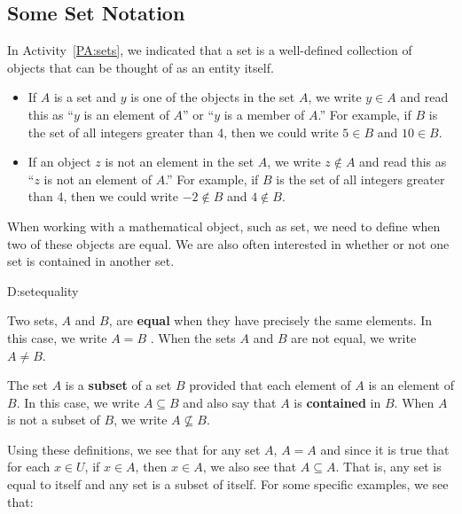 \subsection*{Some Set Notation}\label{SS:sets}
In \typeu Activity~\ref*{PA:sets}, we indicated that a set is a well-defined collection of objects that can be thought of as an entity itself.  
\begin{itemize}
  \item If  $A$  is a set and  $y$  is one of the objects in the set $A$, we write  $y \in A$ 
\label{sym:elementof}%
 and read this as ``$y$ is an element of  $A$''  or ``$y$ is a member of  $A$.''  For example, if $B$ is the set of all integers greater than 4, then we could write $5 \in B$ and $10 \in B$.
  \item If an object  $z$  is not an element in the set  $A$, we write  $z \notin A$ 
\label{sym:notelement}%
 and read this as ``$z$  is not an element of  $A$.''  For example, if $B$ is the set of all integers greater than 4, then we could write $-2 \notin B$ and $4 \notin B$.
\end{itemize}
%
When working with a mathematical object, such as set, we need to define when two of these objects are equal.  We are also often interested in whether or not one set is contained in another set.

\begin{defbox}{D:setequality}{Two sets, $A$ and $B$,  are \textbf{equal} \label{sym:setequal12}
%
%
%
 when they have precisely the same elements.  In this case, we write  $A = B$ \label{sym:setequal2}.  
When the sets  $A$  and  $B$  are not equal, we write  $A \ne B$.

\newpar
The set $A$ is a \textbf{subset} 
%
 of a set $B$ provided that each element of $A$ is an element of $B$.  In this case, we write $A \subseteq B$ and also say that $A$ is \textbf{contained} in $B$.  \label{sym:subset2} 
When $A$ is not a subset of $B$, we write $A \not \subseteq B$.
}
\end{defbox}  
\noindent
Using these definitions, we see that for any set $A$, $A = A$ and since it is true that for each $x \in U$, if $x \in A$, then $x \in A$, we also see that $A \subseteq A$.  That is, any set is equal to itself and any set is a subset of itself.  For some specific examples, we see that:

